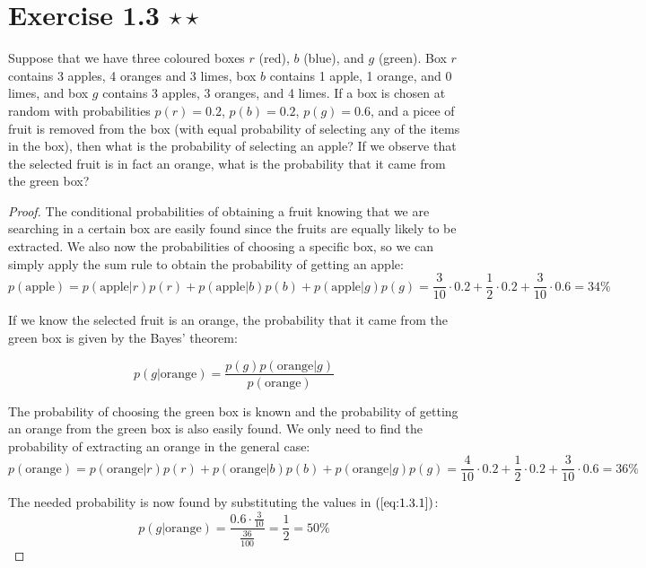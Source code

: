\section*{Exercise 1.3 $\star \star$}
Suppose that we have three coloured boxes $r$ (red), $b$ (blue), and $g$ (green). Box
$r$ contains 3 apples, 4 oranges and 3 limes, box $b$ contains 1 apple, 1 orange, and 0
limes, and box $g$ contains 3 apples, 3 oranges, and 4 limes. If a box is chosen
at random with probabilities $p(r) = 0.2$, $p(b) = 0.2$, $p(g) = 0.6$, and a picee 
of fruit is removed from the box (with equal probability of selecting any of the items
in the box), then what is the probability of selecting an apple? If we observe
that the selected fruit is in fact an orange, what is the probability that it came from
the green box?

\vspace{1em}

\begin{proof}
    The conditional probabilities of obtaining a fruit knowing that we are 
    searching in a certain box are easily found since the fruits are equally
    likely to be extracted. We also now the probabilities of choosing a specific box,
    so we can simply apply the sum rule to obtain the probability of getting an apple:
    \[
        p(\text{apple}) 
        = p(\text{apple} | r)p(r) + p(\text{apple} | b)p(b) + p(\text{apple} | g)p(g) 
        = \frac{3}{10} \cdot 0.2 + \frac{1}{2} \cdot 0.2 + \frac{3}{10} \cdot 0.6
        = 34\%
    \] 

    If we know the selected fruit is an orange, the probability that it came from
    the green box is given by the Bayes' theorem:

    \begin{equation*}\label{eq:1.3.1}\tag{1.3.1}
        p(g | \text{orange}) = \frac{p(g)p(\text{orange} | g)}{p(\text{orange})}
    \end{equation*}

    The probability of choosing the green box is known and the probability of getting
    an orange from the green box is also easily found. We only need to find the probability
    of extracting an orange in the general case:
    \[
        p(\text{orange}) 
        = p(\text{orange} | r)p(r) + p(\text{orange} | b)p(b) + p(\text{orange} | g)p(g) 
        = \frac{4}{10} \cdot 0.2 + \frac{1}{2} \cdot 0.2 + \frac{3}{10} \cdot 0.6
        = 36\%
    \]

    The needed probability is now found by substituting the values in $(\ref{eq:1.3.1})$:
    \[
        p(g | \text{orange}) = \frac{0.6 \cdot \frac{3}{10}}{\frac{36}{100}} = \frac{1}{2} = 50\%
    \] 
\end{proof}

